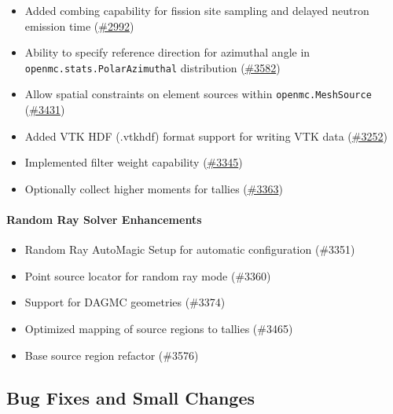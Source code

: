 \begin{itemize}
\item Added combing capability for fission site sampling and delayed neutron emission time (\href{https://github.com/openmc-dev/openmc/pull/2992}{\#2992})
\item Ability to specify reference direction for azimuthal angle in \texttt{openmc.stats.PolarAzimuthal} distribution (\href{https://github.com/openmc-dev/openmc/pull/3582}{\#3582})
\item Allow spatial constraints on element sources within \texttt{openmc.MeshSource} (\href{https://github.com/openmc-dev/openmc/pull/3431}{\#3431})
\item Added VTK HDF (.vtkhdf) format support for writing VTK data (\href{https://github.com/openmc-dev/openmc/pull/3252}{\#3252})
\item Implemented filter weight capability (\href{https://github.com/openmc-dev/openmc/pull/3345}{\#3345})
\item Optionally collect higher moments for tallies (\href{https://github.com/openmc-dev/openmc/pull/3363}{\#3363})
\end{itemize}

\paragraph{Random Ray Solver Enhancements}
\begin{itemize}
\item Random Ray AutoMagic Setup for automatic configuration (\#3351)
\item Point source locator for random ray mode (\#3360)
\item Support for DAGMC geometries (\#3374)
\item Optimized mapping of source regions to tallies (\#3465)
\item Base source region refactor (\#3576)
\end{itemize}

\subsection*{Bug Fixes and Small Changes}


